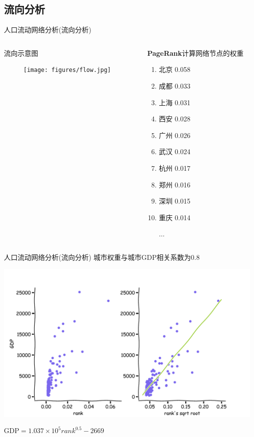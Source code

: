 \subsection{流向分析}

\begin{frame}[t]{人口流动网络分析(流向分析)}
    \begin{columns}
        \begin{column}{0.4 \textwidth}
            \alert{流向示意图}

            \begin{figure}
                \texttt{[image: figures/flow.jpg]}
            \end{figure}
        \end{column}

        \pause
        \begin{column}{0.6 \textwidth}
            \textbf{PageRank}计算网络节点的权重

            \begin{enumerate}
                \item 北京 0.058
                \item 成都 0.033
                \item 上海 0.031
                \item 西安 0.028
                \item 广州 0.026
                \item 武汉 0.024
                \item 杭州 0.017
                \item 郑州 0.016
                \item 深圳 0.015
                \item 重庆 0.014
                
                $\ldots$
            \end{enumerate}
        \end{column}
    \end{columns}
\end{frame}


\begin{frame}[t]{人口流动网络分析(流向分析)}
    城市权重与城市GDP相关系数为0.8

    \pause
    \includegraphics[scale=0.4]{figures/rank_gdp_scatter.pdf}

    $\text{GDP} = 1.037\times 10^5 rank^{0.5}-2669$
\end{frame}

